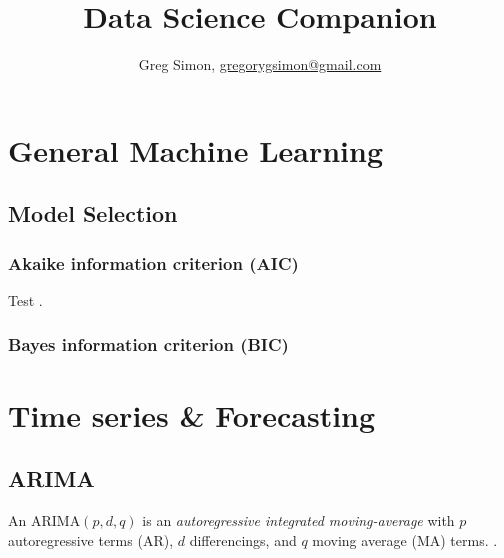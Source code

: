 \documentclass[12pt]{article}
\title{Data Science Companion}
\author{Greg Simon, \url{gregorygsimon@gmail.com}}
\begin{document}
\maketitle



\tableofcontents
\newpage

\section{General Machine Learning}
\newrefsection

\subsection{Model Selection}

\subsubsection{Akaike information criterion (AIC)}

Test \cite{Raftery}.

\subsubsection{Bayes information criterion (BIC)}


\printbibliography[title={References (General Machine Learning)}]
\pagebreak


\section{Time series \& Forecasting}
\newrefsection

\subsection{ARIMA}

An $\text{ARIMA}(p,d,q)$ is an {\sl autoregressive integrated moving-average}
with $p$ autoregressive terms (AR), $d$ differencings, and $q$ moving average
(MA) terms. \cite{fpp}.
\end{document}

